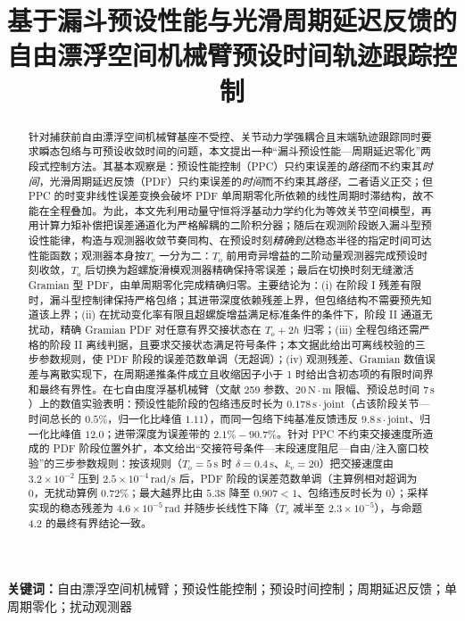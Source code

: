 \documentclass[UTF8,a4paper,12pt]{ctexart}
\title{基于漏斗预设性能与光滑周期延迟反馈的\\自由漂浮空间机械臂预设时间轨迹跟踪控制}
\date{}
\theoremstyle{definition}
\theoremstyle{plain}
\theoremstyle{remark}
\begin{document}
\maketitle

\begin{abstract}
针对捕获前自由漂浮空间机械臂基座不受控、关节动力学强耦合且末端轨迹跟踪同时要求瞬态包络与可预设收敛时间的问题，本文提出一种“漏斗预设性能—周期延迟零化”两段式控制方法。其基本观察是：预设性能控制（PPC）只约束误差的\emph{路径}而不约束其\emph{时间}，光滑周期延迟反馈（PDF）只约束误差的\emph{时间}而不约束其\emph{路径}，二者语义正交；但 PPC 的时变非线性误差变换会破坏 PDF 单周期零化所依赖的线性周期时滞结构，故不能在全程叠加。为此，本文先利用动量守恒将浮基动力学约化为等效关节空间模型，再用计算力矩补偿把误差通道化为严格解耦的二阶积分器；随后在观测阶段嵌入漏斗型预设性能律，构造与观测器收敛节奏同构、在预设时刻\emph{精确到达}稳态半径的指定时间可达性能函数；观测器本身按\(T_o\) 一分为二：\(T_o\) 前用奇异增益的二阶动量观测器完成预设时刻收敛，\(T_o\) 后切换为超螺旋滑模观测器精确保持零误差；最后在切换时刻无缝激活 Gramian 型 PDF，由单周期零化完成精确归零。主要结论为：(i) 在阶段 I 残差有限时，漏斗型控制律保持严格包络；其进带深度依赖残差上界，但包络结构不需要预先知道该上界；(ii) 在扰动变化率有限且超螺旋增益满足标准条件的条件下，阶段 II 通道无扰动，精确 Gramian PDF 对任意有界交接状态在 \(T_o+2h\) 归零；(iii) 全程包络还需严格的阶段 II 离线判据，且要求交接状态满足符号条件；本文据此给出可离线校验的三步参数规则，使 PDF 阶段的误差范数单调（无超调）；(iv) 观测残差、Gramian 数值误差与离散实现下，在周期递推条件成立且收缩因子小于 1 时给出含初态项的有限时间界和最终有界性。在七自由度浮基机械臂（文献 259 参数、\(20\,\mathrm{N\cdot m}\) 限幅、预设总时间 \(7\,\mathrm{s}\)）上的数值实验表明：预设性能阶段的包络违反时长为 \(0.178\,\mathrm{s\cdot joint}\)（占该阶段关节—时间总长的 \(0.5\%\)，归一化比峰值 \(1.11\)），而同一包络下纯基准反馈违反 \(9.8\,\mathrm{s\cdot joint}\)、归一化比峰值 \(12.0\)；进带深度为误差带的 \(2.1\%\!-\!90.7\%\)。针对 PPC 不约束交接速度所造成的 PDF 阶段位置外扩，本文给出“交接符号条件—末段速度阻尼—自由/注入窗口校验”的三步参数规则：按该规则（\(T_o=5\,\mathrm{s}\) 时 \(\delta=0.4\,\mathrm{s}\)、\(k_v=20\)）把交接速度由 \(3.2\times10^{-2}\) 压到 \(2.5\times10^{-4}\,\mathrm{rad/s}\) 后，PDF 阶段的误差范数单调（主算例相对超调为 0，无扰动算例 \(0.72\%\)；最大越界比由 \(5.38\) 降至 \(0.907<1\)、包络违反时长为 0）；采样实现的稳态残差为 \(4.6\times10^{-5}\,\mathrm{rad}\) 并随步长线性下降（\(T_s\) 减半至 \(2.3\times10^{-5}\)），与命题 4.2 的最终有界结论一致。
\end{abstract}

\noindent\textbf{关键词：}自由漂浮空间机械臂；预设性能控制；预设时间控制；周期延迟反馈；单周期零化；扰动观测器








\printbibliography[title={参考文献}]
\end{document}
